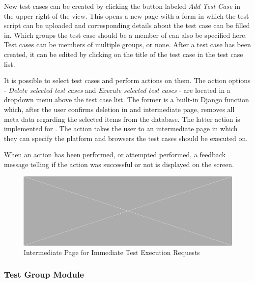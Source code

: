 New test cases can be created by clicking the button labeled \emph{Add Test Case} in the upper right of the view. This opens a new page with a form in which the test script can be uploaded and corresponding details about the test case can be filled in. Which groups the test case should be a member of can also be specified here. Test cases can be members of multiple groups, or none. After a test case has been created, it can be edited by clicking on the title of the test case in the test case list.

It is possible to select test cases and perform actions on them. The action options - \emph{Delete selected test cases} and \emph{Execute selected test cases} - are located in a dropdown menu above the test case list. The former is a built-in Django function which, after the user confirms deletion in and intermediate page, removes all meta data regarding the selected items from the database. The latter action is implemented for \toolname. The action takes the user to an intermediate page in which they can specify the platform and browsers the test cases should be executed on.

When an action has been performed, or attempted performed, a feedback message telling if the action was successful or not is displayed on the screen.


\begin{figure}[h]
    \centering
    \includegraphics[width=\textwidth]{figures/placeholder.png}
    \caption{Intermediate Page for Immediate Test Execution Requests}
    \label{fig.tc_intermediate}
\end{figure}

\subsubsection{Test Group Module}

